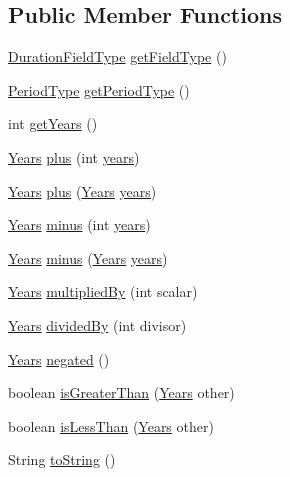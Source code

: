 \subsection*{Public Member Functions}
\begin{DoxyCompactItemize}
\item 
\hyperlink{classorg_1_1joda_1_1time_1_1_duration_field_type}{Duration\-Field\-Type} \hyperlink{classorg_1_1joda_1_1time_1_1_years_adb5b814a82d9ee94907abaaca5b5ce6a}{get\-Field\-Type} ()
\item 
\hyperlink{classorg_1_1joda_1_1time_1_1_period_type}{Period\-Type} \hyperlink{classorg_1_1joda_1_1time_1_1_years_a68c49318920bdda4efc5dee41302900e}{get\-Period\-Type} ()
\item 
int \hyperlink{classorg_1_1joda_1_1time_1_1_years_a4bf458a8d79748b25adb0ad8e0100ede}{get\-Years} ()
\item 
\hyperlink{classorg_1_1joda_1_1time_1_1_years}{Years} \hyperlink{classorg_1_1joda_1_1time_1_1_years_afe4855002be2f8a569920e052e9074d6}{plus} (int \hyperlink{classorg_1_1joda_1_1time_1_1_years_ae2b5cf7d5d98695f37d18f274a0e62a5}{years})
\item 
\hyperlink{classorg_1_1joda_1_1time_1_1_years}{Years} \hyperlink{classorg_1_1joda_1_1time_1_1_years_a55b1cc85e622faeffd1bcd8572d1d719}{plus} (\hyperlink{classorg_1_1joda_1_1time_1_1_years}{Years} \hyperlink{classorg_1_1joda_1_1time_1_1_years_ae2b5cf7d5d98695f37d18f274a0e62a5}{years})
\item 
\hyperlink{classorg_1_1joda_1_1time_1_1_years}{Years} \hyperlink{classorg_1_1joda_1_1time_1_1_years_a0a350f38aa4971970c8af6ee73106c70}{minus} (int \hyperlink{classorg_1_1joda_1_1time_1_1_years_ae2b5cf7d5d98695f37d18f274a0e62a5}{years})
\item 
\hyperlink{classorg_1_1joda_1_1time_1_1_years}{Years} \hyperlink{classorg_1_1joda_1_1time_1_1_years_ad83c141cb6efbbf6fcaf9125c4140568}{minus} (\hyperlink{classorg_1_1joda_1_1time_1_1_years}{Years} \hyperlink{classorg_1_1joda_1_1time_1_1_years_ae2b5cf7d5d98695f37d18f274a0e62a5}{years})
\item 
\hyperlink{classorg_1_1joda_1_1time_1_1_years}{Years} \hyperlink{classorg_1_1joda_1_1time_1_1_years_af033026625014f98c95f7ff1ddd9ebcb}{multiplied\-By} (int scalar)
\item 
\hyperlink{classorg_1_1joda_1_1time_1_1_years}{Years} \hyperlink{classorg_1_1joda_1_1time_1_1_years_a53a04ff32e48c9ade4e7ef2e6e009e3a}{divided\-By} (int divisor)
\item 
\hyperlink{classorg_1_1joda_1_1time_1_1_years}{Years} \hyperlink{classorg_1_1joda_1_1time_1_1_years_a0ed84d0f0ace42e34cc59b3e2f6f2050}{negated} ()
\item 
boolean \hyperlink{classorg_1_1joda_1_1time_1_1_years_a25f30a2a9c8d26c6a5db93481b87c98a}{is\-Greater\-Than} (\hyperlink{classorg_1_1joda_1_1time_1_1_years}{Years} other)
\item 
boolean \hyperlink{classorg_1_1joda_1_1time_1_1_years_aecc638a1603c9a97467e127d00361e02}{is\-Less\-Than} (\hyperlink{classorg_1_1joda_1_1time_1_1_years}{Years} other)
\item 
String \hyperlink{classorg_1_1joda_1_1time_1_1_years_a5f75cf4f2e09700e9c65b72d1dccbf6d}{to\-String} ()
\end{DoxyCompactItemize}
